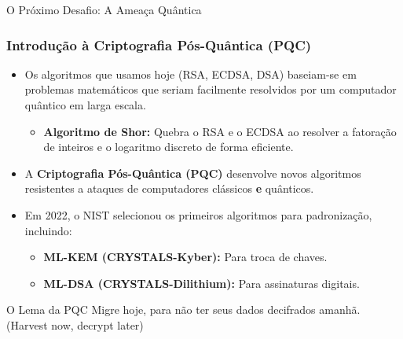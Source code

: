 \documentclass{beamer}
\begin{document}
\begin{frame}{O Próximo Desafio: A Ameaça Quântica}
    \frametitle{Introdução à Criptografia Pós-Quântica (PQC)}

    \begin{itemize}
        \item Os algoritmos que usamos hoje (RSA, ECDSA, DSA) baseiam-se em problemas matemáticos que seriam facilmente resolvidos por um computador quântico em larga escala.
            \begin{itemize}
                \item \textbf{Algoritmo de Shor:} Quebra o RSA e o ECDSA ao resolver a fatoração de inteiros e o logaritmo discreto de forma eficiente.
            \end{itemize}
        \vspace{1em}
        \item A \textbf{Criptografia Pós-Quântica (PQC)} desenvolve novos algoritmos resistentes a ataques de computadores clássicos \textbf{e} quânticos.
        \vspace{1em}
        \item Em 2022, o NIST selecionou os primeiros algoritmos para padronização, incluindo:
            \begin{itemize}
                \item \textbf{ML-KEM (CRYSTALS-Kyber):} Para troca de chaves.
                \item \textbf{ML-DSA (CRYSTALS-Dilithium):} Para assinaturas digitais.
            \end{itemize}
    \end{itemize}
    
    \vfill
    \begin{alertblock}{O Lema da PQC}
        Migre hoje, para não ter seus dados decifrados amanhã. (Harvest now, decrypt later)
    \end{alertblock}
\end{frame}
\end{document}
